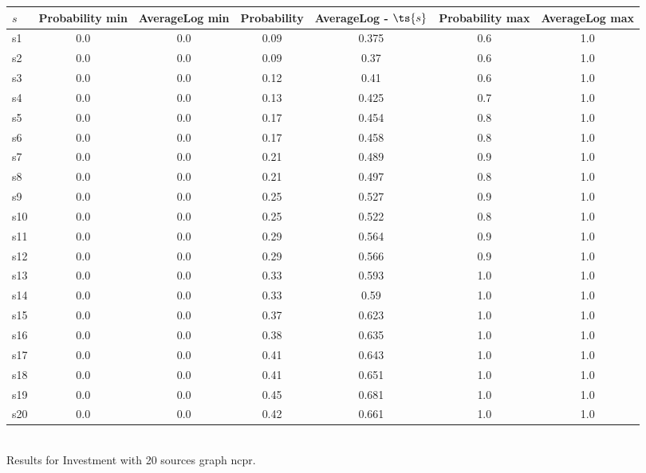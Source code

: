 \documentclass{article}
\begin{document}
\noindent\begin{tabular}{|l|c|c|c|c|c|c|}
\hline
$s$& Probability min & AverageLog min & Probability & AverageLog - $\ts{s}$ & Probability max & AverageLog max\\
\hline
s1 &0.0 & 0.0 & 0.09 & 0.375 & 0.6 & 1.0\\
\hline
s2 &0.0 & 0.0 & 0.09 & 0.37 & 0.6 & 1.0\\
\hline
s3 &0.0 & 0.0 & 0.12 & 0.41 & 0.6 & 1.0\\
\hline
s4 &0.0 & 0.0 & 0.13 & 0.425 & 0.7 & 1.0\\
\hline
s5 &0.0 & 0.0 & 0.17 & 0.454 & 0.8 & 1.0\\
\hline
s6 &0.0 & 0.0 & 0.17 & 0.458 & 0.8 & 1.0\\
\hline
s7 &0.0 & 0.0 & 0.21 & 0.489 & 0.9 & 1.0\\
\hline
s8 &0.0 & 0.0 & 0.21 & 0.497 & 0.8 & 1.0\\
\hline
s9 &0.0 & 0.0 & 0.25 & 0.527 & 0.9 & 1.0\\
\hline
s10 &0.0 & 0.0 & 0.25 & 0.522 & 0.8 & 1.0\\
\hline
s11 &0.0 & 0.0 & 0.29 & 0.564 & 0.9 & 1.0\\
\hline
s12 &0.0 & 0.0 & 0.29 & 0.566 & 0.9 & 1.0\\
\hline
s13 &0.0 & 0.0 & 0.33 & 0.593 & 1.0 & 1.0\\
\hline
s14 &0.0 & 0.0 & 0.33 & 0.59 & 1.0 & 1.0\\
\hline
s15 &0.0 & 0.0 & 0.37 & 0.623 & 1.0 & 1.0\\
\hline
s16 &0.0 & 0.0 & 0.38 & 0.635 & 1.0 & 1.0\\
\hline
s17 &0.0 & 0.0 & 0.41 & 0.643 & 1.0 & 1.0\\
\hline
s18 &0.0 & 0.0 & 0.41 & 0.651 & 1.0 & 1.0\\
\hline
s19 &0.0 & 0.0 & 0.45 & 0.681 & 1.0 & 1.0\\
\hline
s20 &0.0 & 0.0 & 0.42 & 0.661 & 1.0 & 1.0\\
\hline
\end{tabular}\\

\noindent Results for Investment with 20 sources graph ncpr.
\end{document}
